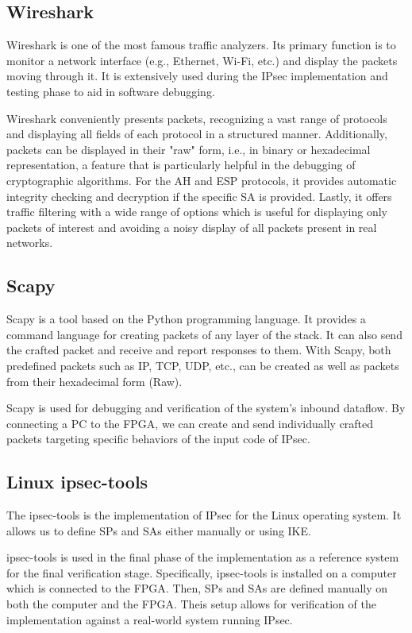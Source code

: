 \subsection{Wireshark}
Wireshark \cite{wireshark_wiki} is one of the most famous traffic analyzers. Its primary function is to monitor a network interface (e.g., Ethernet, Wi-Fi, etc.) and display the packets moving through it. It is extensively used during the IPsec implementation and testing phase to aid in software debugging.

Wireshark conveniently presents packets, recognizing a vast range of protocols and displaying all fields of each protocol in a structured manner. Additionally, packets can be displayed in their "raw" form, i.e., in binary or hexadecimal representation, a feature that is particularly helpful in the debugging of cryptographic algorithms. For the AH and ESP protocols, it provides automatic integrity checking and decryption if the specific SA is provided. Lastly, it offers traffic filtering with a wide range of options which is useful for displaying only packets of interest and avoiding a noisy display of all packets present in real networks.

\subsection{Scapy}
Scapy \cite{Scapy_documentation} is a tool based on the Python programming language. It provides a command language for creating packets of any layer of the stack. It can also send the crafted packet and receive and report responses to them. With Scapy, both predefined packets such as IP, TCP, UDP, etc., can be created as well as packets from their hexadecimal form (Raw).

Scapy is used for debugging and verification of the system's inbound dataflow. By connecting a PC to the FPGA, we can create and send individually crafted packets targeting specific behaviors of the input code of IPsec.

\subsection{Linux ipsec-tools}
The ipsec-tools is the implementation of IPsec for the Linux operating system. It allows us to define SPs and SAs either manually or using IKE.

ipsec-tools is used in the final phase of the implementation as a reference system for the final verification stage. Specifically, ipsec-tools is installed on a computer which is connected to the FPGA. Then, SPs and SAs are defined manually on both the computer and the FPGA. Theis setup allows for verification of the implementation against a real-world system running IPsec.

